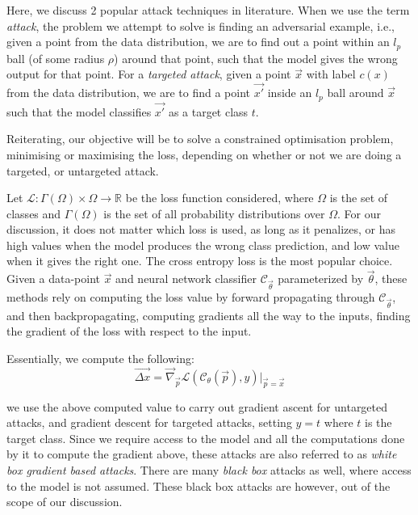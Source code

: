 \documentclass[12pt, oneside]{book}
\begin{document}
Here, we discuss 2 popular attack techniques in literature. When we use the term
\emph{attack}, the problem we attempt to solve is finding an adversarial
example, i.e., given a point from the data distribution, we are to find out a
point within an $l_p$ ball (of some radius $\rho$) around that point, such that
the model gives the wrong output for that point. For a \emph{targeted attack},
given a point $\vec{x}$ with label $c(x)$ from the data distribution, we are to
find a point $\vec{x'}$ inside an $l_p$ ball around $\vec{x}$ such that the
model classifies $\vec{x'}$ as a target class $t$.

Reiterating, our objective will be to solve a constrained optimisation problem,
minimising or maximising the loss, depending on whether or not we are doing a
targeted, or untargeted attack.

Let $\mathcal{L}: \Gamma(\Omega) \times \Omega \to \mathbb{R}$ be the loss
function considered, where $\Omega$ is the set of classes and $\Gamma(\Omega)$
is the set of all probability distributions over $\Omega$. For our discussion,
it does not matter which loss is used, as long as it penalizes, or has high
values when the model produces the wrong class prediction, and low value when it
gives the right one. The cross entropy loss is the most popular choice. Given a
data-point $\vec{x}$ and neural network classifier $\mathcal{C}_\vec{\theta}$
parameterized by $\vec{\theta}$, these methods rely on computing the loss value
by forward propagating through $\mathcal{C}_\vec{\theta}$, and then
backpropagating, computing gradients all the way to the inputs, finding the
gradient of the loss with respect to the input.

Essentially, we compute the following:
\begin{equation*}
    \vec{\Delta x}
    = \vec{\nabla}_\vec{p} \mathcal{L}(\mathcal{C}_\theta (\vec{p}), y)
    \bigr \rvert_{\vec{p}=\vec{x}}
\end{equation*}

we use the above computed value to carry out gradient ascent for untargeted
attacks, and gradient descent for targeted attacks, setting $y=t$ where $t$ is
the target class. Since we require access to the model and all the computations
done by it to compute the gradient above, these attacks are also referred to as
\emph{white box gradient based attacks}. There are many \emph{black box} attacks
as well, where access to the model is not assumed. These black box attacks are
however, out of the scope of our discussion.
\end{document}
